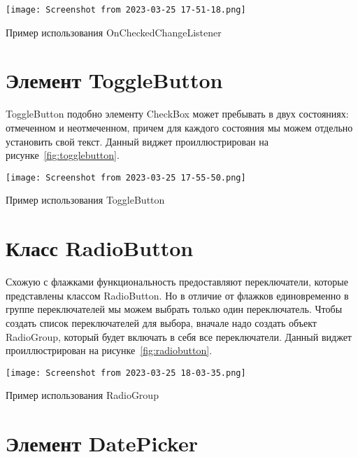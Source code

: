 \begin{image}
	\texttt{[image: Screenshot from 2023-03-25 17-51-18.png]}
	\caption{Пример использования OnCheckedChangeListener}
	\label{fig:checkedchangelistener}
\end{image}

\section{Элемент ToggleButton}
ToggleButton подобно элементу CheckBox может пребывать в двух 
состояниях: отмеченном и неотмеченном, причем для каждого состояния мы 
можем отдельно установить свой текст.
Данный виджет проиллюстрирован на рисунке~\ref{fig:togglebutton}.

\begin{image}
	\texttt{[image: Screenshot from 2023-03-25 17-55-50.png]}
	\caption{Пример использования ToggleButton}
	\label{fig:togglebutton}
\end{image}

\section{Класс RadioButton}
Схожую с флажками функциональность предоставляют 
переключатели, которые представлены классом RadioButton. Но в отличие от 
флажков единовременно в группе переключателей мы можем выбрать только 
один переключатель. Чтобы создать список переключателей для выбора, 
вначале надо создать объект RadioGroup, который будет включать в себя все 
переключатели.
Данный виджет проиллюстрирован на рисунке~\ref{fig:radiobutton}.

\begin{image}
	\texttt{[image: Screenshot from 2023-03-25 18-03-35.png]}
	\caption{Пример использования RadioGroup}
	\label{fig:radiobutton}
\end{image}

\section{Элемент DatePicker}

